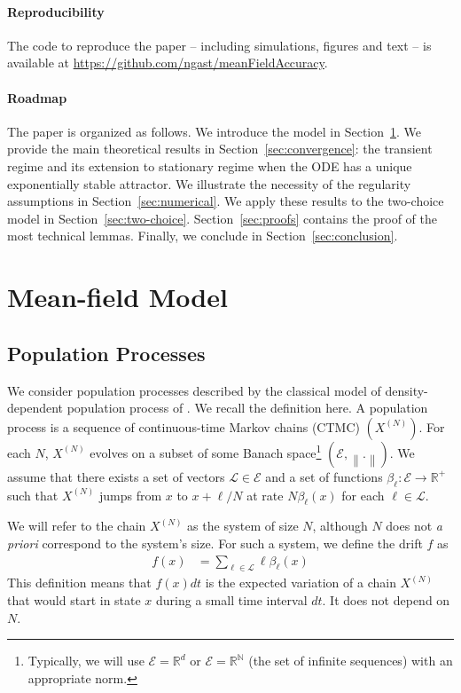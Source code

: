 \documentclass[sigconf]{acmart}
\newcommand\XN{X^{(N)}}
\newcommand\E{\mathcal{E}}
\newcommand\N{\mathbb{N}}
\newcommand\R{\mathbb{R}}
\newcommand\calL{\mathcal{L}}
\newcommand\norm[1]{\left\|#1\right\|}
\begin{document}
\newcommand\githublink{\url{https://github.com/ngast/meanFieldAccuracy}}
\paragraph*{Reproducibility} The code to reproduce the paper --
including simulations, figures and text -- is available at
\githublink. 


\paragraph*{Roadmap} The paper is organized as follows. We introduce
the model in Section~\ref{sec:model}.  We provide the main theoretical
results in Section~\ref{sec:convergence}: the transient regime and its
extension to stationary regime when the ODE has a unique exponentially
stable attractor.
We illustrate the necessity of the regularity assumptions in
Section~\ref{sec:numerical}. We apply these results to the two-choice
model in Section~\ref{sec:two-choice}. Section~\ref{sec:proofs}
contains the proof of the most technical lemmas. 
Finally, we conclude
in Section~\ref{sec:conclusion}.



\section{Mean-field Model}
\label{sec:model}


\subsection{Population Processes}

We consider population processes described by the classical model of
density-dependent population process of
\cite{kurtz70,kurtz1978strong}. We recall the definition here. A
population process is a sequence of continuous-time Markov chains
(CTMC) $(\XN)$. For each $N$, $\XN$ evolves on a subset of some Banach
space\footnote{Typically, we will use $\E=\R^d$ or $\E=\R^{\N}$ (the
  set of infinite sequences) with an appropriate norm.}
$(\E,\norm{.})$. We assume that there exists a set of vectors
$\calL\in \E$ and a set of functions $\beta_\ell:\E\to\R^+$ such that
$\XN$ jumps from $x$ to $x+\ell/N$ at rate $N \beta_\ell(x)$ for each
$\ell\in\calL$.

We will refer to the chain $\XN$ as the system of size $N$, although
$N$ does not \emph{a priori} correspond to the system's size.  For
such a system, we define the drift $f$ as
\begin{align*}
  f(x) &= \sum_{\ell\in\calL}\ell\beta_\ell(x) 
\end{align*}
This definition means that $f(x)dt$ is the expected variation of a
chain $\XN$ that would start in state $x$ during a small time interval
$dt$. It does not depend on $N$. 
\end{document}
